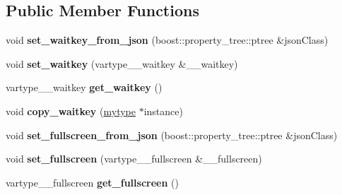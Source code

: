 \subsection*{Public Member Functions}
\begin{DoxyCompactItemize}
\item 
\mbox{\label{classfilter_1_1algos_1_1_show_video_af4890feb0a5feacf329f290b44bb4419}} 
void {\bfseries set\+\_\+waitkey\+\_\+from\+\_\+json} (boost\+::property\+\_\+tree\+::ptree \&json\+Class)
\item 
\mbox{\label{classfilter_1_1algos_1_1_show_video_a85b760391d4a81188a5b016efff6aba6}} 
void {\bfseries set\+\_\+waitkey} (vartype\+\_\+\+\_\+waitkey \&\+\_\+\+\_\+waitkey)
\item 
\mbox{\label{classfilter_1_1algos_1_1_show_video_a5a6f96ad4304380e684b9dfba9728477}} 
vartype\+\_\+\+\_\+waitkey {\bfseries get\+\_\+waitkey} ()
\item 
\mbox{\label{classfilter_1_1algos_1_1_show_video_ac57a4595b21eed354727a9ffae7759e7}} 
void {\bfseries copy\+\_\+waitkey} (\hyperlink{classfilter_1_1algos_1_1_show_video}{mytype} $\ast$instance)
\item 
\mbox{\label{classfilter_1_1algos_1_1_show_video_a73d6bdfaf1375cef5907a5a311c1b6f8}} 
void {\bfseries set\+\_\+fullscreen\+\_\+from\+\_\+json} (boost\+::property\+\_\+tree\+::ptree \&json\+Class)
\item 
\mbox{\label{classfilter_1_1algos_1_1_show_video_a78db49eca5d851a7cd029d65b282c4f2}} 
void {\bfseries set\+\_\+fullscreen} (vartype\+\_\+\+\_\+fullscreen \&\+\_\+\+\_\+fullscreen)
\item 
\mbox{\label{classfilter_1_1algos_1_1_show_video_ae877712fd6a63b271385cd168424fb9f}} 
vartype\+\_\+\+\_\+fullscreen {\bfseries get\+\_\+fullscreen} ()
\item 
\mbox{\label{classfilter_1_1algos_1_1_show_video_a421859158cda83cef11801d0ca397764}} 

\end{DoxyCompactItemize}
